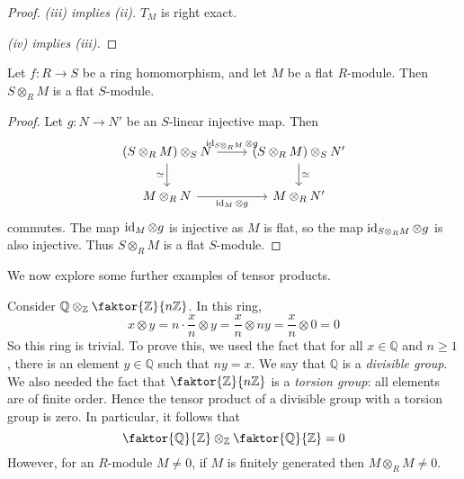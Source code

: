 \begin{proof}
    \emph{(iii) implies (ii).}
    \( T_M \) is right exact.

    \emph{(iv) implies (iii).}
\end{proof}
\begin{proposition}
    Let \( f : R \to S \) be a ring homomorphism, and let \( M \) be a flat \( R \)-module.
    Then \( S \otimes_R M \) is a flat \( S \)-module.
\end{proposition}
\begin{proof}
    Let \( g : N \to N' \) be an \( S \)-linear injective map.
    Then
\[\begin{tikzcd}
	{(S \otimes_R M) \otimes_S N} & {(S \otimes_R M) \otimes_S N'} \\
	{M \otimes_R N} & {M \otimes_R N'}
	\arrow["{\id_M \otimes g}"', from=2-1, to=2-2]
	\arrow["\simeq"', from=1-1, to=2-1]
	\arrow["\simeq", from=1-2, to=2-2]
	\arrow["{\id_{S \otimes_R M} \otimes g}", from=1-1, to=1-2]
\end{tikzcd}\]
    commutes.
    The map \( \operatorname{id}_M \otimes g \) is injective as \( M \) is flat, so the map \( \operatorname{id}_{S \otimes_R M} \otimes g \) is also injective.
    Thus \( S \otimes_R M \) is a flat \( S \)-module.
\end{proof}
We now explore some further examples of tensor products.
\begin{example}
    Consider \( \mathbb Q \otimes_{\mathbb Z} \faktor{\mathbb Z}{n\mathbb Z} \).
    In this ring,
    \[ x \otimes y = n \cdot \frac{x}{n} \otimes y = \frac{x}{n} \otimes ny = \frac{x}{n} \otimes 0 = 0 \]
    So this ring is trivial.
    To prove this, we used the fact that for all \( x \in \mathbb Q \) and \( n \geq 1 \), there is an element \( y \in \mathbb Q \) such that \( ny = x \).
    We say that \( \mathbb Q \) is a \emph{divisible group}.
    We also needed the fact that \( \faktor{\mathbb Z}{n\mathbb Z} \) is a \emph{torsion group}: all elements are of finite order.
    Hence the tensor product of a divisible group with a torsion group is zero.
    In particular, it follows that
    \[ \faktor{\mathbb Q}{\mathbb Z} \otimes_{\mathbb Z} \faktor{\mathbb Q}{\mathbb Z} = 0 \]
    However, for an \( R \)-module \( M \neq 0 \), if \( M \) is finitely generated then \( M \otimes_R M \neq 0 \).
\end{example}
